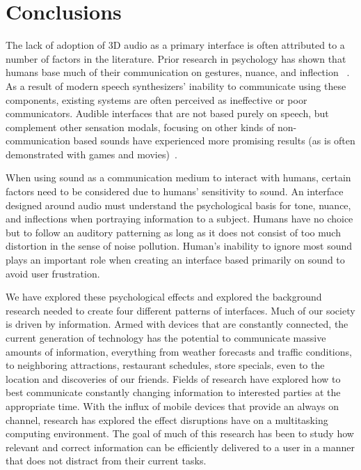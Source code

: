\newpage                                                  \chapter{Conclusions}

The lack of adoption of 3D audio as a primary interface is often attributed to a
number of factors in the literature. Prior research in psychology has shown that
humans base much of their communication on gestures, nuance, and inflection
~\cite{thackara2005bubble}. As a result of modern speech synthesizers’ inability
to communicate using these components, existing systems are often perceived as
ineffective or poor communicators. Audible interfaces that are not based purely
on speech, but complement other sensation modals, focusing on other kinds of
non-communication based sounds have experienced more promising results (as is
often demonstrated with games and movies)~\cite{thackara2005bubble}.

When using sound as a communication medium to interact with humans, certain
factors need to be considered due to humans’ sensitivity to sound. An interface
designed around audio must understand the psychological basis for tone, nuance,
and inflections when portraying information to a subject. Humans have no choice
but to follow an auditory patterning as long as it does not consist of too much
distortion in the sense of noise pollution. Human’s inability to ignore most
sound plays an important role when creating an interface based primarily on
sound to avoid user frustration.

We have explored these psychological effects and explored the background
research needed to create four different patterns of interfaces.  Much of our
society is driven by information. Armed with devices that are constantly
connected, the current generation of technology has the potential to communicate
massive amounts of information, everything from weather forecasts and traffic
conditions, to neighboring attractions, restaurant schedules, store specials,
even to the location and discoveries of our friends. Fields of research have
explored how to best communicate constantly changing information to interested
parties at the appropriate time.  With the influx of mobile devices that provide
an always on channel, research has explored the effect disruptions have on a
multitasking computing environment. The goal of much of this research has been
to study how relevant and correct information can be efficiently delivered to a
user in a manner that does not distract from their current
tasks\cite{McCrickard2003509}.

